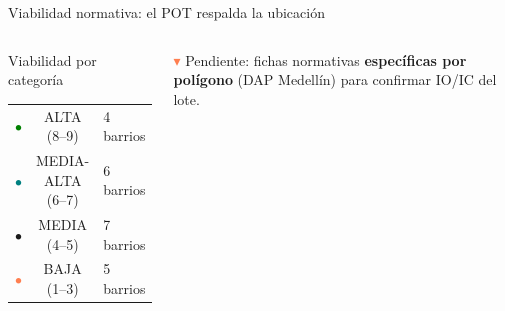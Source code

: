 \documentclass[aspectratio=169, 11pt]{beamer}
\begin{document}
\begin{frame}{Viabilidad normativa: el POT respalda la ubicación}
\begin{columns}[T]
\vspace{4pt}
\begin{block}{\small Viabilidad por categoría}
\footnotesize
\begin{tabular}{@{}lcl@{}}
\textcolor{green}{$\bullet$} & ALTA (8--9) & 4 barrios \\
\textcolor{teal}{$\bullet$} & MEDIA-ALTA (6--7) & 6 barrios \\
\textcolor{amber}{$\bullet$} & MEDIA (4--5) & 7 barrios \\
\textcolor{coral}{$\bullet$} & BAJA (1--3) & 5 barrios \\
\end{tabular}
\end{block}

\vspace{4pt}
{\footnotesize\textcolor{coral}{$\blacktriangledown$} Pendiente: fichas normativas \textbf{específicas por polígono} (DAP Medellín) para confirmar IO/IC del lote.}
\end{columns}
\end{frame}
\end{document}

